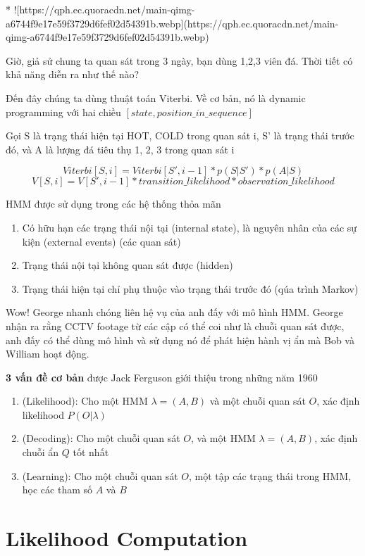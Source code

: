* ![https://qph.ec.quoracdn.net/main-qimg-a6744f9e17e59f3729d6fef02d54391b.webp](https://qph.ec.quoracdn.net/main-qimg-a6744f9e17e59f3729d6fef02d54391b.webp)

Giờ, giả sử chung ta quan sát trong 3 ngày, bạn dùng 1,2,3 viên đá. Thời tiết có khả năng diễn ra như thế nào?

Đến đây chúng ta dùng thuật toán Viterbi. Về cơ bản, nó là dynamic programming với hai chiều $[state, position\_in\_sequence]$

Gọi S là trạng thái hiện tại {HOT, COLD} trong quan sát i, S' là trạng thái trước đó, và A là lượng đá tiêu thụ {1, 2, 3} trong quan sát i

$$Viterbi[S,i] = Viterbi[S', i-1] * p(S|S') * p(A|S)$$
$$V[S,i] = V[S',i-1] * transition\_likelihood * observation\_likelihood$$

HMM được sử dụng trong các hệ thống thỏa mãn

\begin{enumerate}
  \item Có hữu hạn các trạng thái nội tại (internal state), là nguyên nhân của các sự kiện (external events) (các quan sát)
  \item Trạng thái nội tại không quan sát được (hidden)
  \item Trạng thái hiện tại chỉ phụ thuộc vào trạng thái trước đó (qúa trình Markov)
\end{enumerate}

Wow! George nhanh chóng liên hệ vụ của anh đấy với mô hình HMM. George nhận ra rằng CCTV footage từ các cập có thể coi như là chuỗi quan sát được, anh đấy có thể dùng mô hình và sử dụng nó để phát hiện hành vị ẩn mà Bob và William hoạt động.

\textbf{3 vấn đề cơ bản} được Jack Ferguson giới thiệu trong những năm 1960

\begin{enumerate}
  \item (Likelihood): Cho một HMM $\lambda = (A, B)$ và một chuỗi quan sát $O$, xác định likelihood $P(O|\lambda)$
  \item (Decoding): Cho một chuỗi quan sát $O$, và một HMM $\lambda = (A,B)$, xác định chuỗi ẩn $Q$ tốt nhất
  \item (Learning): Cho một chuỗi quan sát $O$, một tập các trạng thái trong HMM, học các tham số $A$ và $B$
\end{enumerate}

\section{Likelihood Computation}


